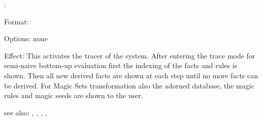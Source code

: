 \spy:

Format: 

Options: none

Effect: This activates the tracer of the \FORWARD{} system. After entering the 
	trace mode for semi-naive bottom-up evaluation first the indexing of the
	facts and rules is shown. Then all new derived facts are shown at each 
	step until no more facts can be derived. For Magic Sets transformation 
	also the adorned database, the magic rules and magic seeds are shown to 
	the user. 

see also: , , , , \nospy
